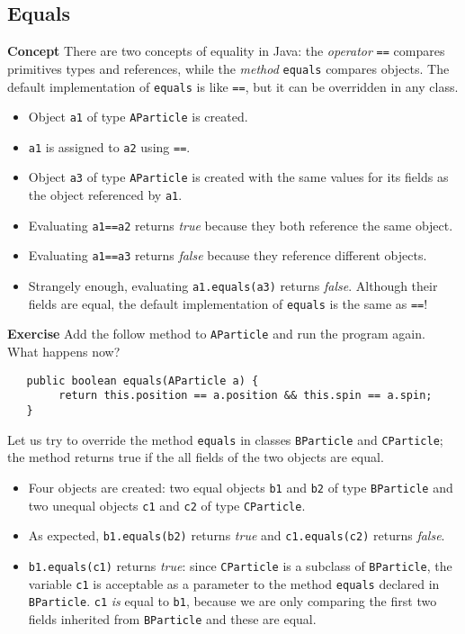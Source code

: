 \subsection{Equals}\label{inher.07}

\textbf{Concept} There are two concepts of equality in Java: the \emph{operator} 
\texttt{==} compares primitives types and references, while the \emph{method}
\texttt{equals} compares objects. The default implementation of 
\texttt{equals} is like \texttt{==}, but it can be overridden in any class.


\begin{itemize}
\item Object \texttt{a1} of type \texttt{AParticle} is created.
\item \texttt{a1} is assigned to \texttt{a2} using \texttt{==}.
\item Object \texttt{a3} of type \texttt{AParticle} is created with the 
same values for its fields as the object referenced by \texttt{a1}.
\item Evaluating \texttt{a1==a2} returns \emph{true} because they both reference the same object.
\item Evaluating \texttt{a1==a3} returns \emph{false} because they reference different objects.
\item Strangely enough, evaluating \texttt{a1.equals(a3)} returns \emph{false}.
Although their fields are equal, the default implementation of \texttt{equals} is
the same as \texttt{==}!
\end{itemize}

\textbf{Exercise} Add the follow method to \texttt{AParticle} and run the
program again. What happens now?
\begin{verbatim}
   public boolean equals(AParticle a) {
        return this.position == a.position && this.spin == a.spin;
   }
\end{verbatim}

\bigskip


Let us try to override the method \texttt{equals} in classes \texttt{BParticle}
and \texttt{CParticle}; the method returns true if the all fields of the
two objects are equal.
\begin{itemize}
\item Four objects are created: two equal objects \texttt{b1} and \texttt{b2}
of type \texttt{BParticle} and two unequal objects \texttt{c1} and \texttt{c2}
of type \texttt{CParticle}.
\item As expected, \texttt{b1.equals(b2)} returns \emph{true} and \texttt{c1.equals(c2)} returns \emph{false}.
\item \texttt{b1.equals(c1)} returns \emph{true}: since \texttt{CParticle}
is a subclass of \texttt{BParticle}, the variable \texttt{c1} is acceptable
as a parameter to the method \texttt{equals} declared in \texttt{BParticle}.
\texttt{c1} \emph{is} equal to \texttt{b1}, because we are only comparing 
the first two fields inherited from \texttt{BParticle} and these are equal.
\end{itemize}

